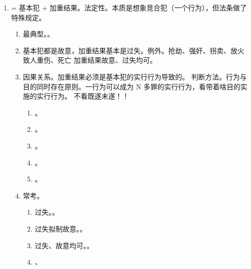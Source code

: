 \begin{enumerate}
  \item {} = 基本犯 + 加重结果。法定性。本质是想象竞合犯（一个行为），但法条做了特殊规定。
        \begin{enumerate}
          \item 最典型。。
          \item 基本犯都是故意，加重结果基本是过失。例外。抢劫、强奸、拐卖、放火致人重伤、死亡 \yjt 加重结果故意、过失均可。
          \item 因果关系。加重结果必须是基本犯的实行行为导致的。
                判断方法。行为与目的同时存在原则。一行为可以成为 N 多罪的实行行为，看带着啥目的实施的实行行为。
                不看既遂未遂！！
                \begin{enumerate}
                  \item {}。
                  \item {}。
                  \item {}。
                  \item {}。
                  \item {}。
                \end{enumerate}
          \item 常考。
                \begin{enumerate}
                  \item 过失。。
                  \item 过失拟制故意。。
                  \item 过失、故意均可。。
                  \item {}、
                \end{enumerate}
        \end{enumerate}
\end{enumerate}
